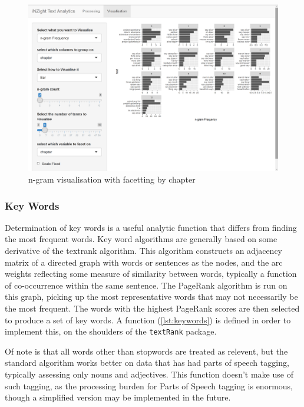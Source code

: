\message{ !name(jason-cairns-dissertation.tex)}\documentclass[11pt, a4paper, titlepage]{report}
\begin{document}
\begin{figure}
\centering
\includegraphics[scale=0.35]{visualisation-n-gram-facet.png}
\caption{n-gram visualisation with facetting by chapter\label{fig:visualisation-n-gram-facet}}
\end{figure}

\subsubsection{Key Words}\label{sec:key-words}

Determination of key words is a useful analytic function that differs
from finding the most frequent words. Key word algorithms are
generally based on some derivative of the textrank algorithm. This
algorithm constructs an adjacency matrix of a directed graph with
words or sentences as the nodes, and the arc weights reflecting some
measure of similarity between words, typically a function of
co-occurrence within the same sentence. The PageRank algorithm is run
on this graph, picking up the most representative words that may not
necessarily be the most frequent. The words with the highest PageRank
scores are then selected to produce a set of key words. A function
(\cref{lst:keywords}) is defined in order to implement this, on the
shoulders of the \texttt{textRank}
package\autocite{wijffels19}.

Of note is that all words other than stopwords are treated as
relevent, but the standard algorithm works better on data that has had
parts of speech tagging, typically assessing only nouns and
adjectives. This function doesn't make use of such tagging, as the
processing burden for Parts of Speech tagging is enormous, though a
simplified version may be implemented in the future.
\end{document}
